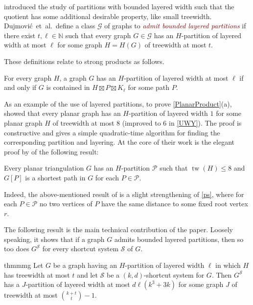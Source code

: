 \documentclass{patmorin}
\newcommand{\defin}[1]{\textcolor{Maroon}{\emph{#1}}}
\DeclareMathOperator{\tw}{tw}
\newcommand{\PP}{\mathcal{P}}
\renewcommand{\SS}{\mathcal{S}}
\renewcommand{\leq}{\leqslant}
\begin{document}
\citet{DJMMUW20} introduced the study of partitions with bounded layered width such that the quotient has some additional desirable property, like small treewidth. Dujmovi\'c~et~al.\ define a class $\mathcal{G}$ of graphs to \defin{admit bounded layered partitions} if there exist $t,\ell\in\mathbb{N}$ such that every graph $G\in \mathcal{G}$ has an $H$-partition of layered width at most $\ell$ for some graph $H=H(G)$ of treewidth at most $t$.

These definitions relate to strong products as follows.

\begin{lem}
\label{PartitionProduct}
For every graph $H$, a graph $G$ has an $H$-partition of layered width at most $\ell$ if and only if $G$ is contained in $H \boxtimes P \boxtimes K_\ell$ for some path $P$.
\end{lem}

As an example of the use of layered partitions, to prove \cref{PlanarProduct}(a),
\citet{DJMMUW20} showed that every planar graph has an $H$-partition of layered width $1$ for some planar graph $H$ of treewidth at most $8$ (improved to $6$ in \cref{UWY}). The proof is constructive and gives a simple quadratic-time algorithm for finding the corresponding partition and layering. At the core of their work is the elegant proof by \citet{PS21} of the following result:

\begin{thm}[\citep{PS21}]
\label{ps}
Every planar triangulation $G$ has an $H$-partition $\PP$
such that $\tw(H)\leq 8$ and $G[P]$ is a shortest path in $G$ for each $P\in\PP$.
\end{thm}

Indeed, the above-mentioned result of \citet{DJMMUW20} is a slight strengthening of \cref{ps}, where for each $P\in\PP$ no two vertices of $P$ have the same distance to some fixed root vertex $r$.

The following result is the main technical contribution of the paper. Loosely speaking, it shows that if a graph $G$ admits bounded layered partitions, then so too does $G^\SS$ for every shortcut system $\SS$ of $G$.

\begin{restatable}{thm}{mmg}
	\label{ShortcutPartition}
	Let $G$ be a graph having an $H$-partition of layered width $\ell$ in which $H$ has treewidth at most $t$ and let $\SS$ be a $(k,d)$-shortcut system for $G$.  Then $G^\SS$ has a $J$-partition of layered width at most $d\ell(k^3+3k)$ for some graph $J$ of treewidth at most $\binom{k+t}{t}-1$.
\end{restatable}
\end{document}
